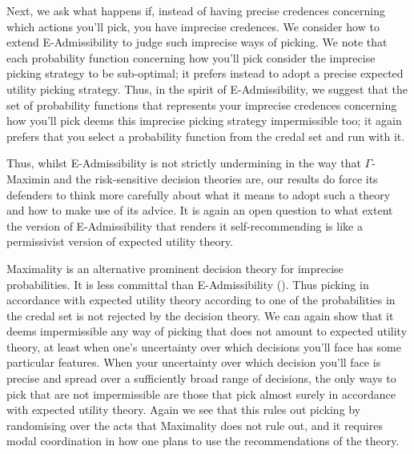 \documentclass[a4paper,final]{article}
\newenvironment{CCM rewritten}
{\begingroup\color{blue}} %
{\endgroup}              %
\begin{document}
	 Next, we ask what happens if, instead of having precise credences concerning which actions you'll pick, you have imprecise credences. We consider how to extend E-Admissibility to judge such imprecise ways of picking.	 
	 We note that each probability function concerning how you'll pick consider the imprecise picking strategy to be sub-optimal; it 
	  prefers instead to adopt a precise expected utility picking strategy. Thus, in the spirit of E-Admissibility, we suggest that the set of probability functions that represents your imprecise credences concerning how you'll pick deems this imprecise picking strategy impermissible too; it again prefers that you select a probability function from the credal set and run with it. 
	 
 	Thus, whilst E-Admissibility is not strictly undermining in the way that $\Gamma$-Maximin and the risk-sensitive decision theories are, our results do force its defenders to think more carefully about what it means to adopt such a theory and how to make use of its advice. It is again an open question to what extent the version of E-Admissibility that renders it self-recommending is like a permissivist version of expected utility theory. %
	 
	 Maximality is an alternative prominent decision theory for imprecise probabilities. It is less committal than E-Admissibility (). Thus picking in accordance with expected utility theory according to one of the probabilities in the credal set is not rejected by the decision theory. 
	 We can again show that it deems impermissible any way of picking that does not amount to expected utility theory, at least when one's uncertainty over which decisions you'll face has some particular features. When your uncertainty over which decision you'll face is precise and spread over a sufficiently broad range of decisions, the only ways to pick that are not impermissible are those that pick almost surely in accordance with expected utility theory. Again we see that this rules out picking by randomising over the acts that Maximality does not rule out, and it requires modal coordination in how one plans to use the recommendations of the theory. 
	 
	 
	 
	 
	 
	
\end{document}
